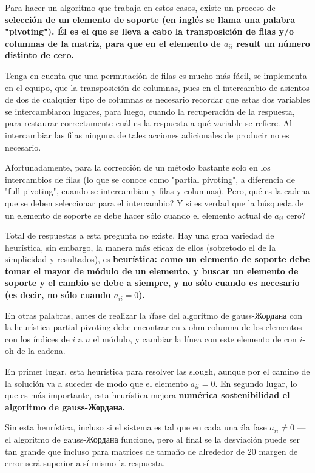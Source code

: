 Para hacer un algoritmo que trabaja en estos casos, existe un proceso de \bf{selección de un elemento de soporte} (en inglés se llama una palabra "pivoting"). Él es el que se lleva a cabo la transposición de filas y/o columnas de la matriz, para que en el elemento de $a_{ii}$ result un número distinto de cero.

Tenga en cuenta que una permutación de filas es mucho más fácil, se implementa en el equipo, que la transposición de columnas, pues en el intercambio de asientos de dos de cualquier tipo de columnas es necesario recordar que estas dos variables se intercambiaron lugares, para luego, cuando la recuperación de la respuesta, para restaurar correctamente cuál es la respuesta a qué variable se refiere. Al intercambiar las filas ninguna de tales acciones adicionales de producir no es necesario.

Afortunadamente, para la corrección de un método bastante solo en los intercambios de filas (lo que se conoce como "partial pivoting", a diferencia de "full pivoting", cuando se intercambian y filas y columnas). Pero, qué es la cadena que se deben seleccionar para el intercambio? Y si es verdad que la búsqueda de un elemento de soporte se debe hacer sólo cuando el elemento actual de $a_{ii}$ cero?

Total de respuestas a esta pregunta no existe. Hay una gran variedad de heurística, sin embargo, la manera más eficaz de ellos (sobretodo el de la simplicidad y resultados), es \bf{heurística}: como un elemento de soporte debe tomar el mayor de módulo de un elemento, y buscar un elemento de soporte y el cambio se debe a \bf{siempre}, y no sólo cuando es necesario (es decir, no sólo cuando $a_{ii}=0$).

En otras palabras, antes de realizar la $i$fase del algoritmo de gauss-Жордана con la heurística partial pivoting debe encontrar en $i$-ohm columna de los elementos con los índices de $i$ a $n$ el módulo, y cambiar la línea con este elemento de con $i$-oh de la cadena.

En primer lugar, esta heurística para resolver las slough, aunque por el camino de la solución va a suceder de modo que el elemento $a_{ii}=0$. En segundo lugar, lo que es más importante, esta heurística mejora \bf{numérica sostenibilidad} el algoritmo de gauss-Жордана.

Sin esta heurística, incluso si el sistema es tal que en cada una $i$la fase $a_{ii} \ne 0$ --- el algoritmo de gauss-Жордана funcione, pero al final se la desviación puede ser tan grande que incluso para matrices de tamaño de alrededor de $20$ margen de error será superior a sí mismo la respuesta.



